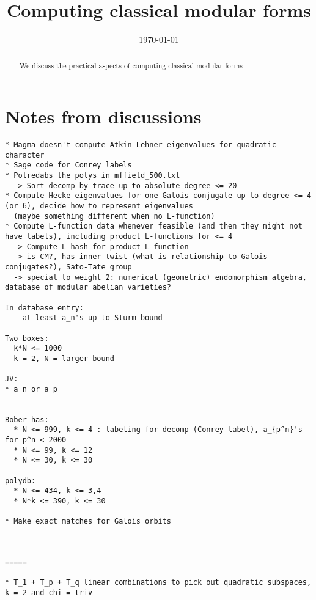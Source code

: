 \documentclass[11pt]{amsart}
\numberwithin{equation}{subsection}
\theoremstyle{definition}
\begin{document}
\title{Computing classical modular forms}
\author{}
\address{}
\email{}
\urladdr{}

\author{}
\address{}
\email{}
\urladdr{}


\date{\today}


\begin{abstract}
We discuss the practical aspects of computing classical modular forms 
\end{abstract}

\maketitle

\section{Notes from discussions}

\begin{verbatim}
* Magma doesn't compute Atkin-Lehner eigenvalues for quadratic character
* Sage code for Conrey labels
* Polredabs the polys in mffield_500.txt
  -> Sort decomp by trace up to absolute degree <= 20
* Compute Hecke eigenvalues for one Galois conjugate up to degree <= 4 (or 6), decide how to represent eigenvalues
  (maybe something different when no L-function)
* Compute L-function data whenever feasible (and then they might not have labels), including product L-functions for <= 4
  -> Compute L-hash for product L-function
  -> is CM?, has inner twist (what is relationship to Galois conjugates?), Sato-Tate group
  -> special to weight 2: numerical (geometric) endomorphism algebra, database of modular abelian varieties?

In database entry:
  - at least a_n's up to Sturm bound
           
Two boxes:
  k*N <= 1000
  k = 2, N = larger bound
           
JV:
* a_n or a_p


Bober has:
  * N <= 999, k <= 4 : labeling for decomp (Conrey label), a_{p^n}'s for p^n < 2000 
  * N <= 99, k <= 12 
  * N <= 30, k <= 30 

polydb: 
  * N <= 434, k <= 3,4
  * N*k <= 390, k <= 30
  
* Make exact matches for Galois orbits



=====

* T_1 + T_p + T_q linear combinations to pick out quadratic subspaces, k = 2 and chi = triv

\end{verbatim}
\end{document}
